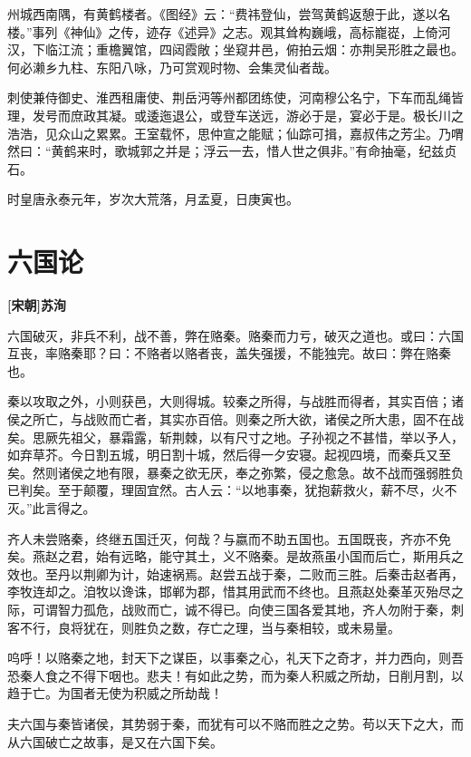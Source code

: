 \documentclass[UTF8,titlepage,oneside]{ctexbook}
\begin{document}
州城西南隅，有黄鹤楼者。《图经》云：“费祎登仙，尝驾黄鹤返憩于此，遂以名楼。”事列《神仙》之传，迹存《述异》之志。观其耸构巍峨，高标巃嵸，上倚河汉，下临江流；重檐翼馆，四闼霞敞；坐窥井邑，俯拍云烟：亦荆吴形胜之最也。何必濑乡九柱、东阳八咏，乃可赏观时物、会集灵仙者哉。

刺使兼侍御史、淮西租庸使、荆岳沔等州都团练使，河南穆公名宁，下车而乱绳皆理，发号而庶政其凝。或逶迤退公，或登车送远，游必于是，宴必于是。极长川之浩浩，见众山之累累。王室载怀，思仲宣之能赋；仙踪可揖，嘉叔伟之芳尘。乃喟然曰：“黄鹤来时，歌城郭之并是；浮云一去，惜人世之俱非。”有命抽毫，纪兹贞石。

时皇唐永泰元年，岁次大荒落，月孟夏，日庚寅也。


\chapter*{六国论}
\begin{center}
	\textbf{[宋朝]苏洵}
\end{center}


六国破灭，非兵不利，战不善，弊在赂秦。赂秦而力亏，破灭之道也。或曰：六国互丧，率赂秦耶？曰：不赂者以赂者丧，盖失强援，不能独完。故曰：弊在赂秦也。


秦以攻取之外，小则获邑，大则得城。较秦之所得，与战胜而得者，其实百倍；诸侯之所亡，与战败而亡者，其实亦百倍。则秦之所大欲，诸侯之所大患，固不在战矣。思厥先祖父，暴霜露，斩荆棘，以有尺寸之地。子孙视之不甚惜，举以予人，如弃草芥。今日割五城，明日割十城，然后得一夕安寝。起视四境，而秦兵又至矣。然则诸侯之地有限，暴秦之欲无厌，奉之弥繁，侵之愈急。故不战而强弱胜负已判矣。至于颠覆，理固宜然。古人云：“以地事秦，犹抱薪救火，薪不尽，火不灭。”此言得之。


齐人未尝赂秦，终继五国迁灭，何哉？与嬴而不助五国也。五国既丧，齐亦不免矣。燕赵之君，始有远略，能守其土，义不赂秦。是故燕虽小国而后亡，斯用兵之效也。至丹以荆卿为计，始速祸焉。赵尝五战于秦，二败而三胜。后秦击赵者再，李牧连却之。洎牧以谗诛，邯郸为郡，惜其用武而不终也。且燕赵处秦革灭殆尽之际，可谓智力孤危，战败而亡，诚不得已。向使三国各爱其地，齐人勿附于秦，刺客不行，良将犹在，则胜负之数，存亡之理，当与秦相较，或未易量。


呜呼！以赂秦之地，封天下之谋臣，以事秦之心，礼天下之奇才，并力西向，则吾恐秦人食之不得下咽也。悲夫！有如此之势，而为秦人积威之所劫，日削月割，以趋于亡。为国者无使为积威之所劫哉！


夫六国与秦皆诸侯，其势弱于秦，而犹有可以不赂而胜之之势。苟以天下之大，而从六国破亡之故事，是又在六国下矣。
\end{document}
